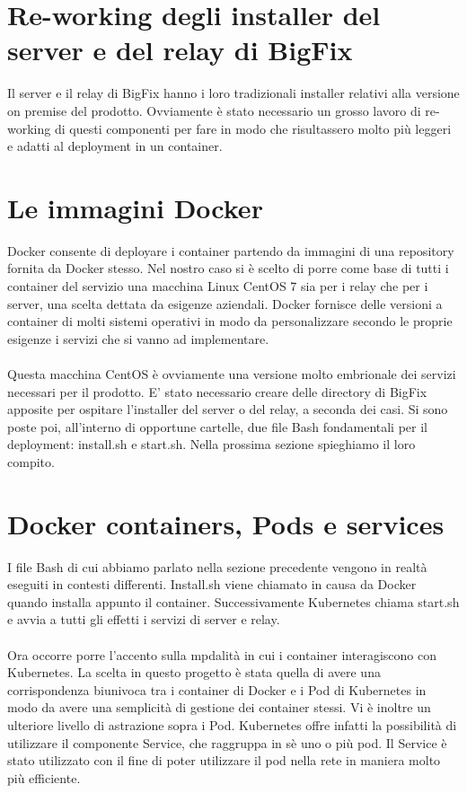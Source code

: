 \section{Re-working degli installer del server e del relay di BigFix}
Il server e il relay di BigFix hanno i loro tradizionali installer relativi alla versione on premise del prodotto. Ovviamente è stato necessario un grosso lavoro di re-working di questi componenti per fare in modo che risultassero molto più leggeri e adatti al deployment in un container.

\section{Le immagini Docker}
Docker consente di deployare i container partendo da immagini di una repository fornita da Docker stesso. Nel nostro caso si è scelto di porre come base di tutti i container del servizio una macchina Linux CentOS 7 sia per i relay che per i server, una scelta dettata da esigenze aziendali. Docker fornisce delle versioni a container di molti sistemi operativi in modo da personalizzare secondo le proprie esigenze i servizi che si vanno ad implementare.

\paragraph{}
Questa macchina CentOS è ovviamente una versione molto embrionale dei servizi necessari per il prodotto. E' stato necessario creare delle directory di BigFix apposite per ospitare l'installer del server o del relay, a seconda dei casi. Si sono poste poi, all'interno di opportune cartelle, due file Bash fondamentali per il deployment: install.sh e start.sh. Nella prossima sezione spieghiamo il loro compito.

\section{Docker containers, Pods e services}
I file Bash di cui abbiamo parlato nella sezione precedente vengono in realtà eseguiti in contesti differenti. Install.sh viene chiamato in causa da Docker quando installa appunto il container. Successivamente Kubernetes chiama start.sh e avvia a tutti gli effetti i servizi di server e relay.
\paragraph{}
Ora occorre porre l'accento sulla mpdalità in cui i container interagiscono con Kubernetes. La scelta in questo progetto è stata quella di avere una corrispondenza biunivoca tra i container di Docker e i Pod di Kubernetes in modo da avere una semplicità di gestione dei container stessi. Vi è inoltre un ulteriore livello di astrazione sopra i Pod. Kubernetes offre infatti la possibilità di utilizzare il componente Service, che raggruppa in sè uno o più pod. Il Service è stato utilizzato con il fine di poter utilizzare il pod nella rete in maniera molto più efficiente.
